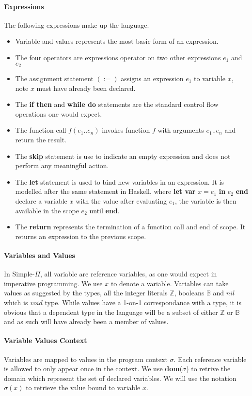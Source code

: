 \documentclass[a4paper,12pt]{report}
\begin{document}
\paragraph{Expressions} The following expressions make up the language.
\begin{itemize}
  \item Variable and values represents the most basic form of an expression.
  \item The four operators are expressions operator on two other expressions $e_1$ 
  and $e_2$
  \item The assignment statement $(:=)$ assigns an expression $e_1$ to variable 
  $x$, note $x$ must have already been declared. 
  \item The \textbf{if then} and \textbf{while do} statements are the standard 
  control flow operations one would expect.
  \item The function call $f(e_1..e_n)$ invokes function $f$ with arguments 
  $e_1..e_n$ and return the result.
  \item The \textbf{skip} statement is use to indicate an empty expression and 
  does not perform any meaningful action. 
  \item The \textbf{let} statement is used to bind new variables in an 
  expression. It is modelled after the same statement in Haskell, where \textbf{let var } 
  $x = e_1$ \textbf{in} $e_2$ \textbf{end} declare a variable $x$ with the value after 
  evaluating $e_1$, the variable is then available in the scope $e_2$ until 
  \textbf{end}.
  \item The \textbf{return} represents the termination of a function call and 
  end of scope. It returns an expression to the previous scope. 
\end{itemize}

\paragraph{Variables and Values} In Simple-$\Pi$, all variable are reference 
variables, as one would expect in imperative programming. We use $x$ to denote a 
variable. Variables can take values as suggested by the types, all the integer 
literals $\mathbb{Z}$, booleans $\mathbb{B}$ and $nil$ which is $void$ type. 
While values have a 1-on-1 correspondance with a type, it is obvious that a 
dependent type in the language will be a subset of either 
$\mathbb{Z}$ or $\mathbb{B}$ and as such will have already been a member of 
values.

\paragraph{Variable Values Context} Variables are mapped to values in the program 
context $\sigma$. Each reference variable is allowed to only appear once in 
the context. We use \textbf{dom}($\sigma$) to retrive the domain which represent 
the set of declared variables. We will use the notation $\sigma(x)$ 
to retrieve the value bound to variable $x$.
\end{document}
